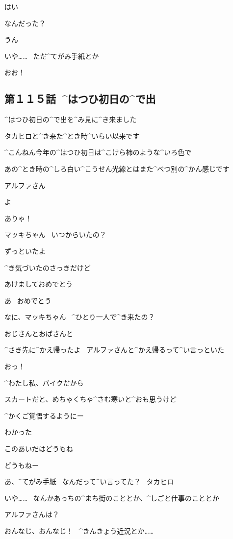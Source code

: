 \T はい

\page
\A なんだった？

\M うん

\page
\M いや……
\ ただ^{てがみ}{手紙}とか

\A おお！


\subsection{第１１５話\ ^{はつひ}{初日}の^{で}{出}}

\page[64]
\A ^{はつひ}{初日}の^{で}{出}を^{み}{見}に^{き}{来}ました

\page[66]
\A タカヒロと^{き}{来}た^{とき}{時}^{いらい}{以来}です

\A ^{こんねん}{今年}の^{はつひ}{初日}は^{こけら}{柿}のような^{いろ}{色}で

\A あの^{とき}{時}の^{しろ}{白}い^{こうせん}{光線}とはまた^{べつ}{別}の^{かん}{感}じです

\page
\M アルファさん

\page
\M よ

\A ありゃ！

\A マッキちゃん
\ いつからいたの？

\M ずっといたよ

\M ^{き}{気}づいたのさっきだけど

\page
\M あけましておめでとう

\A あ
\ おめでとう

\A なに、マッキちゃん
\ ^{ひとり}{一人}で^{き}{来}たの？

\M おじさんとおばさんと

\M ^{さき}{先}に^{かえ}{帰}ったよ
\ アルファさんと^{かえ}{帰}るって^{い}{言}っといた

\A おっ！

\page
\A ^{わたし}{私}、バイクだから

\A スカートだと、めちゃくちゃ^{さむ}{寒}いと^{おも}{思}うけど

\A ^{かくご}{覚悟}するようにー

\M わかった

\page
\M このあいだはどうもね

\A どうもねー

\A あ、^{てがみ}{手紙}
\ なんだって^{い}{言}ってた？
\ タカヒロ

\M いや……
\ なんかあっちの^{まち}{街}のこととか、^{しごと}{仕事}のこととか

\M アルファさんは？

\A おんなじ、おんなじ！
\ ^{きんきょう}{近況}とか……

